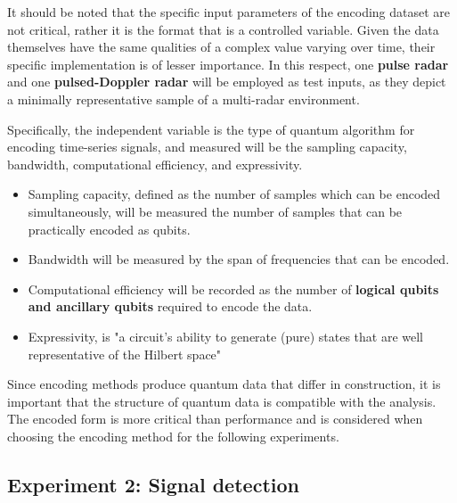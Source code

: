 It should be noted that the specific input parameters of the encoding dataset are not critical, rather it is the format that is a controlled variable.
Given the data themselves have the same qualities of a complex value varying over time, their specific implementation is of lesser importance.
In this respect, one \textbf{pulse radar} and one \textbf{pulsed-Doppler radar} will be employed as test inputs, as they depict a minimally representative sample of a multi-radar environment. 

Specifically, the independent variable is the type of quantum algorithm for encoding time-series signals, and measured will be the sampling capacity, bandwidth, computational efficiency, and expressivity.
\begin{itemize}
    \item Sampling capacity, defined as the number of samples which can be encoded simultaneously, will be measured the number of samples that can be practically encoded as qubits.
    \item Bandwidth will be measured by the span of frequencies that can be encoded.
    \item Computational efficiency will be recorded as the number of \textbf{logical qubits and ancillary qubits} required to encode the data.
    \item Expressivity, is "a circuit’s ability to generate (pure) states that are well representative of the Hilbert space" \cite{sim_expressibility_2019} 
\end{itemize}
Since encoding methods produce quantum data that differ in construction, it is important that the structure of quantum data is compatible with the analysis.
The encoded form is more critical than performance and is considered when choosing the encoding method for the following experiments.


\subsection{Experiment 2: Signal detection}

